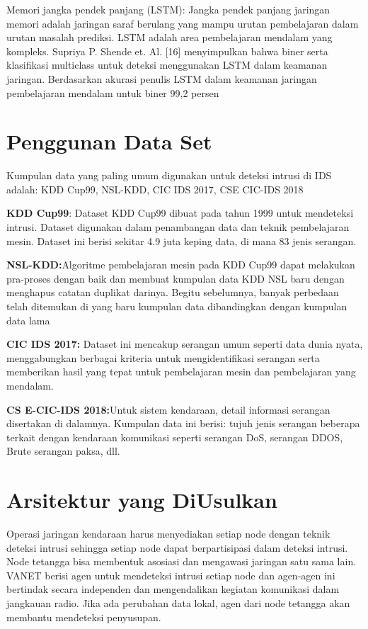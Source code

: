 \documentclass[conference]{IEEEtran}
\begin{document}
Memori jangka pendek panjang (LSTM): Jangka pendek panjang
jaringan memori adalah jaringan saraf berulang yang mampu
urutan pembelajaran dalam urutan masalah prediksi. LSTM adalah
area pembelajaran mendalam yang kompleks. Supriya P. Shende et. Al. [16]\cite{yong2019intrusion}
menyimpulkan bahwa biner serta klasifikasi multiclass
untuk deteksi menggunakan LSTM dalam keamanan jaringan. Berdasarkan
akurasi penulis LSTM dalam keamanan jaringan pembelajaran mendalam
untuk biner 99,2 persen

\section{Penggunan Data Set}
Kumpulan data yang paling umum digunakan untuk deteksi intrusi
di IDS adalah: KDD Cup99, NSL-KDD, CIC IDS 2017, CSE CIC-IDS 2018

\textbf{KDD Cup99}: Dataset KDD Cup99 dibuat pada tahun 1999
untuk mendeteksi intrusi. Dataset digunakan dalam penambangan data dan
teknik pembelajaran mesin. Dataset ini berisi sekitar 4.9
juta keping data, di mana 83%
jenis serangan.

\textbf{NSL-KDD:}Algoritme pembelajaran mesin pada KDD Cup99 dapat melakukan pra-proses dengan baik dan membuat kumpulan data KDD NSL baru dengan menghapus catatan duplikat darinya. Begitu
sebelumnya, banyak perbedaan telah ditemukan di yang baru
kumpulan data dibandingkan dengan kumpulan data lama


\textbf{CIC IDS 2017:} Dataset ini mencakup serangan umum seperti
data dunia nyata, menggabungkan berbagai kriteria untuk mengidentifikasi serangan serta memberikan hasil yang tepat untuk pembelajaran mesin
dan pembelajaran yang mendalam.

\textbf{CS E-CIC-IDS 2018:}Untuk sistem kendaraan, detail
informasi serangan disertakan di dalamnya. Kumpulan data ini berisi:
tujuh jenis serangan beberapa terkait dengan kendaraan
komunikasi seperti serangan DoS, serangan DDOS, Brute
serangan paksa, dll.

\section{Arsitektur yang DiUsulkan}
Operasi jaringan kendaraan harus menyediakan setiap node dengan
teknik deteksi intrusi sehingga setiap node dapat
berpartisipasi dalam deteksi intrusi. Node tetangga bisa
membentuk asosiasi dan mengawasi jaringan satu sama lain.
VANET berisi agen untuk mendeteksi intrusi setiap node
dan agen-agen ini bertindak secara independen dan mengendalikan
kegiatan komunikasi dalam jangkauan radio. Jika ada
perubahan data lokal, agen dari node tetangga akan
membantu mendeteksi penyusupan.\cite{shende2020long}
\end{document}
